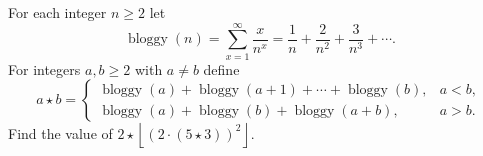 For each integer $n\ge2$ let
\[\operatorname{bloggy}(n)=\sum_{x=1}^{\infty}\dfrac{x}{n^x}=\dfrac1n+\dfrac2{n^2}+\dfrac3{n^3}+\cdots.\]
For integers $a,b\ge2$ with $a\ne b$ define
\[a\star b=\begin{cases}\operatorname{bloggy}(a)+\operatorname{bloggy}(a+1)+\cdots+\operatorname{bloggy}(b), & a<b,\\[1ex] \operatorname{bloggy}(a)+\operatorname{bloggy}(b)+\operatorname{bloggy}(a+b), & a>b.\end{cases}\]
Find the value of $2\star\left\lfloor\left(2\cdot(5\star3)\right)^2\right\rfloor$.
